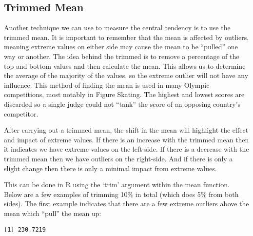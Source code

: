 \documentclass[
  letterpaper,
  DIV=11,
  numbers=noendperiod]{scrreprt}
\newenvironment{Shaded}{\begin{snugshade}}{\end{snugshade}}
\newcommand{\AttributeTok}[1]{\textcolor[rgb]{0.40,0.45,0.13}{#1}}
\newcommand{\DecValTok}[1]{\textcolor[rgb]{0.68,0.00,0.00}{#1}}
\newcommand{\FunctionTok}[1]{\textcolor[rgb]{0.28,0.35,0.67}{#1}}
\newcommand{\NormalTok}[1]{\textcolor[rgb]{0.00,0.23,0.31}{#1}}
\newcommand{\SpecialCharTok}[1]{\textcolor[rgb]{0.37,0.37,0.37}{#1}}
\begin{document}
\subsection{Trimmed Mean}\label{trimmed-mean}

Another technique we can use to measure the central tendency is to use
the trimmed mean. It is important to remember that the mean is affected
by outliers, meaning extreme values on either side may cause the mean to
be ``pulled'' one way or another. The idea behind the trimmed is to
remove a percentage of the top and bottom values and then calculate the
mean. This allows us to determine the average of the majority of the
values, so the extreme outlier will not have any influence. This method
of finding the mean is used in many Olympic competitions, most notably
in Figure Skating. The highest and lowest scores are discarded so a
single judge could not ``tank'' the score of an opposing country's
competitor.

After carrying out a trimmed mean, the shift in the mean will highlight
the effect and impact of extreme values. If there is an increase with
the trimmed mean then it indicates we have extreme values on the
left-side. If there is a decrease with the trimmed mean then we have
outliers on the right-side. And if there is only a slight change then
there is only a minimal impact from extreme values.

This can be done in R using the `trim' argument within the mean
function. Below are a few examples of trimming 10\% in total (which does
5\% from both sides). The first example indicates that there are a few
extreme outliers above the mean which ``pull'' the mean up:

\begin{Shaded}
\end{Shaded}

\begin{verbatim}
[1] 230.7219
\end{verbatim}

\begin{Shaded}
\end{Shaded}
\end{document}
